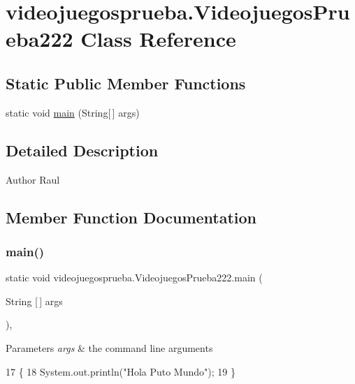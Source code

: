 \hypertarget{classvideojuegosprueba_1_1_videojuegos_prueba222}{}\section{videojuegosprueba.\+Videojuegos\+Prueba222 Class Reference}
\label{classvideojuegosprueba_1_1_videojuegos_prueba222}
\subsection*{Static Public Member Functions}
\begin{DoxyCompactItemize}
\item 
static void \mbox{\hyperlink{classvideojuegosprueba_1_1_videojuegos_prueba222_ac2f73b93d71f07f65ef870376ae9eb16}{main}} (String\mbox{[}$\,$\mbox{]} args)
\end{DoxyCompactItemize}


\subsection{Detailed Description}
\begin{DoxyAuthor}{Author}
Raul 
\end{DoxyAuthor}


\subsection{Member Function Documentation}
\mbox{\label{classvideojuegosprueba_1_1_videojuegos_prueba222_ac2f73b93d71f07f65ef870376ae9eb16}} 
\subsubsection{\texorpdfstring{main()}{main()}}
{\footnotesize\ttfamily static void videojuegosprueba.\+Videojuegos\+Prueba222.\+main (\begin{DoxyParamCaption}\item[{String \mbox{[}$\,$\mbox{]}}]{args }\end{DoxyParamCaption})\hspace{0.3cm}{\ttfamily [inline]}, {\ttfamily [static]}}


\begin{DoxyParams}{Parameters}
{\em args} & the command line arguments \\
\hline
\end{DoxyParams}

\begin{DoxyCode}
17                                            \{
18         System.out.println(\textcolor{stringliteral}{"Hola Puto Mundo"});
19     \}
\end{DoxyCode}
